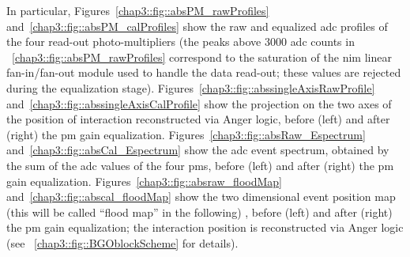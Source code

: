 In particular, Figures~\ref{chap3::fig::absPM_rawProfiles} and~\ref{chap3::fig::absPM_calProfiles} show the raw and equalized \gls{adc} profiles of the four read-out photo-multipliers (the peaks above 3000 \gls{adc} counts in \figurename~\ref{chap3::fig::absPM_rawProfiles} correspond to the saturation of the \gls{nim} linear fan-in/fan-out module used to handle the data read-out; these values are rejected during the equalization stage).
Figures~\ref{chap3::fig::abssingleAxisRawProfile} and~\ref{chap3::fig::abssingleAxisCalProfile} show the projection on the two axes of the position of interaction reconstructed via Anger logic, before (left) and after (right) the \gls{pm} gain equalization.
Figures~\ref{chap3::fig::absRaw_Espectrum} and~\ref{chap3::fig::absCal_Espectrum} show the \gls{adc} event spectrum, obtained by the sum of the \gls{adc} values of the four \glspl{pm}, before (left) and after (right) the \gls{pm} gain equalization.
Figures~\ref{chap3::fig::absraw_floodMap} and~\ref{chap3::fig::abscal_floodMap} show the two dimensional event position map (this will be called \enquote{flood map} in the following) , before (left) and after (right) the \gls{pm} gain equalization; the interaction position is reconstructed via Anger logic (see \figurename~\ref{chap3::fig::BGOblockScheme} for details).

